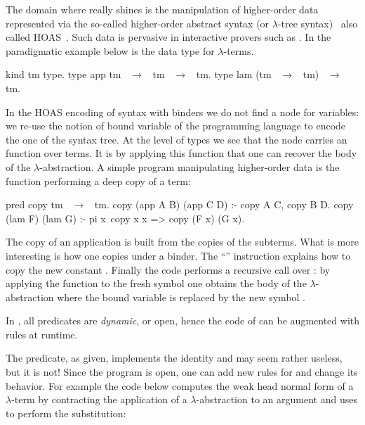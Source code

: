 
The domain where \elpi really shines is the manipulation of higher-order data
represented via the so-called higher-order abstract syntax (or $\lambda$-tree syntax)~\cite{miller2018}
also called HOAS~\cite{pfenning1988}.
Such data is pervasive in interactive provers
such as \rocq. In the paradigmatic example below  is
the data type for $\lambda$-terms.
%
\begin{elpicode}
kind tm type.                      %
type app tm ~$\to$~ tm ~$\to$~ tm.            %
type lam (tm ~$\to$~ tm) ~$\to$~ tm.          %
\end{elpicode}
%
In the HOAS encoding of syntax with binders we do not find a node for variables:
we re-use the notion of bound variable of the programming language to encode the
one of the syntax tree. At the level of types we see that the 
node carries an \elpi function over terms. It is by applying this function
that one can recover the body of the $\lambda$-abstraction.
A simple program manipulating higher-order data is the function
performing a deep copy of a term:
%
\begin{elpicode}
pred copy tm ~$\to$~ tm.
copy (app A B) (app C D) :- copy A C, copy B D.
copy (lam F)   (lam G)   :- pi x\ copy x x => copy (F x) (G x).
\end{elpicode}
%
The copy of an application is built from the copies of the subterms. What is
more interesting is how one copies under a binder.
The ``'' instruction
explains how to copy the new constant .
Finally the code performs a recursive call over :
by applying the \elpi function  to
the fresh symbol  one obtains the body of the $\lambda$-abstraction
where the bound variable is replaced
by the new symbol .

In \elpi, all predicates are \emph{dynamic}, or open, hence
the code of  can be
augmented with rules at runtime. 

The  predicate, as given, implements the identity and may seem rather useless, 
but it is not! Since the program is open, one can add new rules for
 and change its behavior. For example the code below
computes the weak head normal form of a $\lambda$-term by contracting
the application of a $\lambda$-abstraction
to an argument and uses  to perform the substitution:

